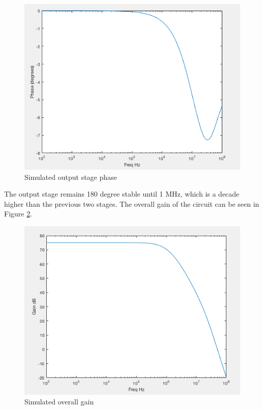 \begin{figure}[H]
	\begin{center}
		\includegraphics[scale=.30]{Simulations/phaselaststage.png}
		\caption{Simulated output stage phase}
		\label{fig:outputphase}
	\end{center}
\end{figure} 

The output stage remains 180 degree stable until 1 MHz, which is a decade higher than the previous two stages. The overall gain of the circuit can be seen in Figure \ref{fig:overallgain}. 

\begin{figure}[H]
	\begin{center}
		\includegraphics[scale=.30]{Simulations/gain_overall.png}
		\caption{Simulated overall gain}
		\label{fig:overallgain}
	\end{center}
\end{figure} 

